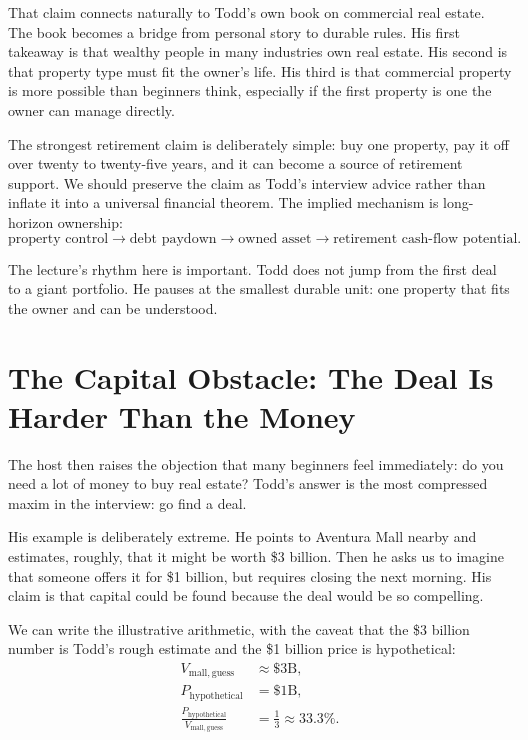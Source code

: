 That claim connects naturally to Todd's own book on commercial real estate. The book becomes a bridge from personal story to durable rules. His first takeaway is that wealthy people in many industries own real estate. His second is that property type must fit the owner's life. His third is that commercial property is more possible than beginners think, especially if the first property is one the owner can manage directly.

The strongest retirement claim is deliberately simple: buy one property, pay it off over twenty to twenty-five years, and it can become a source of retirement support. We should preserve the claim as Todd's interview advice rather than inflate it into a universal financial theorem. The implied mechanism is long-horizon ownership:
\begin{equation}
\text{property control}
\longrightarrow
\text{debt paydown}
\longrightarrow
\text{owned asset}
\longrightarrow
\text{retirement cash-flow potential}.
\end{equation}

The lecture's rhythm here is important. Todd does not jump from the first deal to a giant portfolio. He pauses at the smallest durable unit: one property that fits the owner and can be understood.

\section{The Capital Obstacle: The Deal Is Harder Than the Money}

The host then raises the objection that many beginners feel immediately: do you need a lot of money to buy real estate? Todd's answer is the most compressed maxim in the interview: go find a deal.

His example is deliberately extreme. He points to Aventura Mall nearby and estimates, roughly, that it might be worth \$3 billion. Then he asks us to imagine that someone offers it for \$1 billion, but requires closing the next morning. His claim is that capital could be found because the deal would be so compelling.

We can write the illustrative arithmetic, with the caveat that the \$3 billion number is Todd's rough estimate and the \$1 billion price is hypothetical:
\begin{align}
V_{\mathrm{mall,guess}}&\approx \$3\mathrm{B},\\
P_{\mathrm{hypothetical}}&=\$1\mathrm{B},\\
\frac{P_{\mathrm{hypothetical}}}{V_{\mathrm{mall,guess}}}
&=
\frac{1}{3}
\approx 33.3\%.
\end{align}

